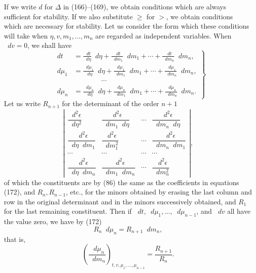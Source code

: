 \documentclass[11pt]{article}
\newcommand{\dd}{\mathop{}\!d}
\newcommand{\eps}{\epsilon}
\newcommand{\D}{\Delta}
\begin{document}
If we write $d$ for $\D$ in (166)--(169), we obtain conditions which are always sufficient for stability. If we also substitute $\geq$ for $>$, we obtain conditions which are necessary for stability. Let us consider the form which these conditions will take when $\eta,v,m_1,\ldots,m_n$ are regarded as independent variables. When $\dd v=0$, we shall have
\begin{equation}
\left.\begin{aligned}
\dd t&=\frac{\dd t}{\dd\eta}\dd\eta+\frac{\dd t}{\dd m_1}\dd m_1+\cdots+\frac{\dd t}{\dd m_n}\dd m_n,\\
\dd\mu_1&=\frac{\dd\mu_1}{\dd\eta}\dd\eta+\frac{\dd\mu_1}{\dd m_1}\dd m_1+\cdots+\frac{\dd\mu_1}{\dd m_n}\dd m_n,\\
&\hspace{4em}\cdots\\
\dd\mu_n&=\frac{\dd\mu_n}{\dd\eta}\dd\eta+\frac{\dd\mu_n}{\dd m_1}\dd m_1+\cdots+\frac{\dd\mu_n}{\dd m_n}\dd m_n.
\end{aligned}\right\}
\end{equation}
Let us write $R_{n+1}$ for the determinant of the order $n+1$
\begin{equation}
\left|\begin{array}{cccc}
\dfrac{\dd^2\eps}{\dd\eta^2} & \dfrac{\dd^2\eps}{\dd m_1\dd\eta} & \cdots & \dfrac{\dd^2\eps}{\dd m_n\dd\eta}\\[1.0em]
\dfrac{\dd^2\eps}{\dd\eta\dd m_1} & \dfrac{\dd^2\eps}{\dd m_1^2} & \cdots & \dfrac{\dd^2\eps}{\dd m_n\dd m_1}\\[1.0em]
\cdots & \cdots & \cdots & \cdots\\[0.5em]
\dfrac{\dd^2\eps}{\dd\eta\dd m_n} & \dfrac{\dd^2\eps}{\dd m_1\dd m_n} & \cdots & \dfrac{\dd^2\eps}{\dd m_n^2}
\end{array}\right|,
\end{equation}
of which the constituents are by (86) the same as the coefficients in equations (172), and $R_n,R_{n-1}$, etc., for the minors obtained by erasing the last column and row in the original determinant and in the minors successively obtained, and $R_1$ for the last remaining constituent. Then if $\dd t,\dd\mu_1,\ldots,\dd\mu_{n-1}$, and $\dd v$ all have the value zero, we have by (172)
\begin{equation}
R_n\dd\mu_n=R_{n+1}\dd m_n,
\end{equation}
that is,
\begin{equation}
\left(\frac{\dd\mu_n}{\dd m_n}\right)_{t,v,\mu_1,\ldots,\mu_{n-1}}=\frac{R_{n+1}}{R_n}.
\end{equation}
\end{document}
